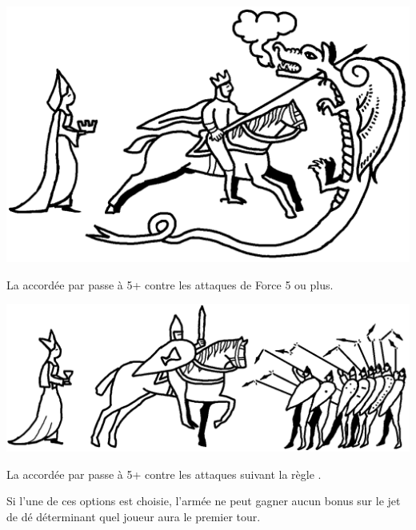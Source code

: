 \begin{multicols}{2}
\begin{center}
\includegraphics[scale=0.18]{pics/tokenoftheking.png}

\vspace*{5pt}
\textbf{\tokenoftheking}

\vspace*{5pt}
La \wardsave{} accordée par \theblessing{} passe à 5+ contre les attaques de Force 5 ou plus.
\end{center}

\columnbreak

\begin{center}
\vspace*{\fill}
\includegraphics[scale=0.18]{pics/tokenofthegrail.png}
\vspace*{26pt}

\textbf{\tokenofthegrail}

\vspace*{5pt}
La \wardsave{} accordée par \theblessing{} passe à 5+ contre les attaques suivant la règle \armourpiercing{}.
\end{center}
\end{multicols}

Si l'une de ces options est choisie, l'armée ne peut gagner aucun bonus sur le jet de dé déterminant quel joueur aura le premier tour. 
 
